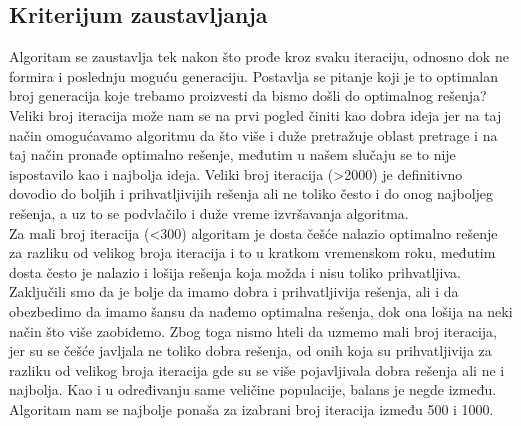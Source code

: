 \documentclass[a4paper]{article}
\begin{document}
\subsection{Kriterijum zaustavljanja}
Algoritam se zaustavlja tek nakon što prođe kroz svaku iteraciju, odnosno dok ne formira i poslednju moguću generaciju. Postavlja se pitanje koji je to optimalan broj generacija koje trebamo proizvesti da bismo došli do optimalnog rešenja? \\ 
Veliki broj iteracija može nam se na prvi pogled činiti kao dobra ideja jer na taj način omogućavamo algoritmu da što više i duže pretražuje oblast pretrage i na taj način pronađe optimalno rešenje, međutim u našem slučaju se to nije ispostavilo kao i najbolja ideja. Veliki broj iteracija (>2000) je definitivno dovodio do boljih i prihvatljivijih rešenja ali ne toliko često i do onog najboljeg rešenja, a uz to se podvlačilo i duže vreme izvršavanja algoritma. \\
Za mali broj iteracija (<300) algoritam je dosta češće nalazio optimalno rešenje za razliku od velikog broja iteracija i to u kratkom vremenskom roku, međutim dosta često je nalazio i lošija rešenja koja možda i nisu toliko prihvatljiva. \\
Zaključili smo da je bolje da imamo dobra i prihvatljivija rešenja, ali i da obezbedimo da imamo šansu da nađemo optimalna rešenja, dok ona lošija na neki način što više zaobiđemo. Zbog toga nismo hteli da uzmemo mali broj iteracija, jer su se češće javljala ne toliko dobra rešenja, od onih koja su prihvatljivija za razliku od velikog broja iteracija gde su se više pojavljivala dobra rešenja ali ne i najbolja. Kao i u određivanju same veličine populacije, balans je negde između. Algoritam nam se najbolje ponaša za izabrani broj iteracija između 500 i 1000. \cite{numOfGener}
\end{document}
